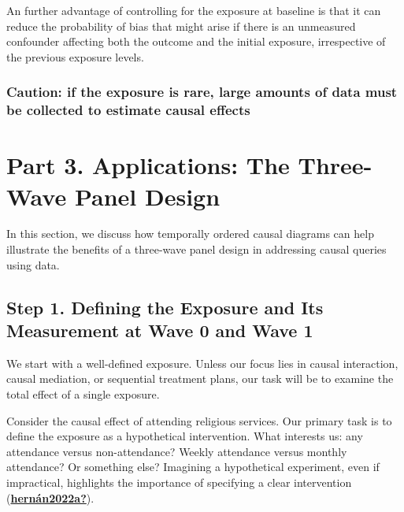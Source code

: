 \documentclass[
  singlecolumn]{report}
\begin{document}
An further advantage of controlling for the exposure at baseline is that
it can reduce the probability of bias that might arise if there is an
unmeasured confounder affecting both the outcome and the initial
exposure, irrespective of the previous exposure levels.

\hypertarget{caution-if-the-exposure-is-rare-large-amounts-of-data-must-be-collected-to-estimate-causal-effects}{%
\subsubsection{\texorpdfstring{\textbf{Caution: if the exposure is rare,
large amounts of data must be collected to estimate causal
effects}}{Caution: if the exposure is rare, large amounts of data must be collected to estimate causal effects}}\label{caution-if-the-exposure-is-rare-large-amounts-of-data-must-be-collected-to-estimate-causal-effects}}

\hypertarget{part-3.-applications-the-three-wave-panel-design}{%
\section{Part 3. Applications: The Three-Wave Panel
Design}\label{part-3.-applications-the-three-wave-panel-design}}

In this section, we discuss how temporally ordered causal diagrams can
help illustrate the benefits of a three-wave panel design in addressing
causal queries using data.

\hypertarget{step-1.-defining-the-exposure-and-its-measurement-at-wave-0-and-wave-1}{%
\subsection{Step 1. Defining the Exposure and Its Measurement at Wave 0
and Wave
1}\label{step-1.-defining-the-exposure-and-its-measurement-at-wave-0-and-wave-1}}

We start with a well-defined exposure. Unless our focus lies in causal
interaction, causal mediation, or sequential treatment plans, our task
will be to examine the total effect of a single exposure.

Consider the causal effect of attending religious services. Our primary
task is to define the exposure as a hypothetical intervention. What
interests us: any attendance versus non-attendance? Weekly attendance
versus monthly attendance? Or something else? Imagining a hypothetical
experiment, even if impractical, highlights the importance of specifying
a clear intervention
(\protect\hyperlink{ref-hernuxe1n2022a}{\textbf{hernán2022a?}}).
\end{document}
